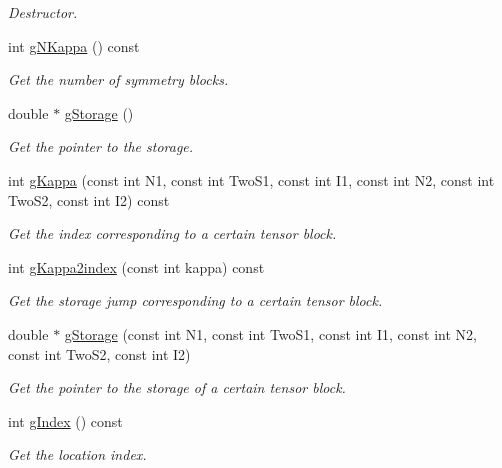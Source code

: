 \begin{DoxyCompactItemize}
\begin{DoxyCompactList}\small\item\em Destructor. \end{DoxyCompactList}\item 
int \hyperlink{classCheMPS2_1_1TensorO_af7627c14abf78df122a247be0433548a}{g\-N\-Kappa} () const 
\begin{DoxyCompactList}\small\item\em Get the number of symmetry blocks. \end{DoxyCompactList}\item 
double $\ast$ \hyperlink{classCheMPS2_1_1TensorO_a49ebfadf7c59cba53ed94d3550680b32}{g\-Storage} ()
\begin{DoxyCompactList}\small\item\em Get the pointer to the storage. \end{DoxyCompactList}\item 
int \hyperlink{classCheMPS2_1_1TensorO_a70e145a634ea6f4f11bda963d5ec921e}{g\-Kappa} (const int N1, const int Two\-S1, const int I1, const int N2, const int Two\-S2, const int I2) const 
\begin{DoxyCompactList}\small\item\em Get the index corresponding to a certain tensor block. \end{DoxyCompactList}\item 
int \hyperlink{classCheMPS2_1_1TensorO_a029f1d4ac89aa3388abe506a39a40e13}{g\-Kappa2index} (const int kappa) const 
\begin{DoxyCompactList}\small\item\em Get the storage jump corresponding to a certain tensor block. \end{DoxyCompactList}\item 
double $\ast$ \hyperlink{classCheMPS2_1_1TensorO_a0497f1564460187328d761c6c03fa79f}{g\-Storage} (const int N1, const int Two\-S1, const int I1, const int N2, const int Two\-S2, const int I2)
\begin{DoxyCompactList}\small\item\em Get the pointer to the storage of a certain tensor block. \end{DoxyCompactList}\item 
int \hyperlink{classCheMPS2_1_1TensorO_aae7c5ea2b1ef7e9925dfa060b8e93fd6}{g\-Index} () const 
\begin{DoxyCompactList}\small\item\em Get the location index. \end{DoxyCompactList}\item 

\end{DoxyCompactItemize}

